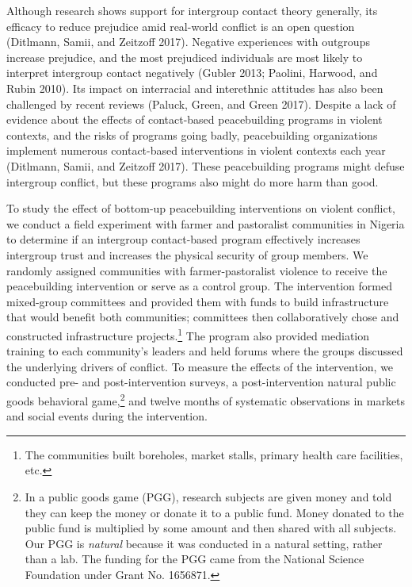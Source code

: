 \documentclass[11pt]{article}
\begin{document}
Although research shows support for intergroup contact theory generally,
its efficacy to reduce prejudice amid real-world conflict is an open
question (Ditlmann, Samii, and Zeitzoff 2017). Negative experiences with
outgroups increase prejudice, and the most prejudiced individuals are
most likely to interpret intergroup contact negatively (Gubler 2013;
Paolini, Harwood, and Rubin 2010). Its impact on interracial and
interethnic attitudes has also been challenged by recent reviews
(Paluck, Green, and Green 2017). Despite a lack of evidence about the
effects of contact-based peacebuilding programs in violent contexts, and
the risks of programs going badly, peacebuilding organizations implement
numerous contact-based interventions in violent contexts each year
(Ditlmann, Samii, and Zeitzoff 2017). These peacebuilding programs might
defuse intergroup conflict, but these programs also might do more harm
than good.

To study the effect of bottom-up peacebuilding interventions on violent
conflict, we conduct a field experiment with farmer and pastoralist
communities in Nigeria to determine if an intergroup contact-based
program effectively increases intergroup trust and increases the
physical security of group members. We randomly assigned communities
with farmer-pastoralist violence to receive the peacebuilding
intervention or serve as a control group. The intervention formed
mixed-group committees and provided them with funds to build
infrastructure that would benefit both communities; committees then
collaboratively chose and constructed infrastructure projects.\footnote{The
  communities built boreholes, market stalls, primary health care
  facilities, etc.} The program also provided mediation training to each
community's leaders and held forums where the groups discussed the
underlying drivers of conflict. To measure the effects of the
intervention, we conducted pre- and post-intervention surveys, a
post-intervention natural public goods behavioral game,\footnote{In a
  public goods game (PGG), research subjects are given money and told
  they can keep the money or donate it to a public fund. Money donated
  to the public fund is multiplied by some amount and then shared with
  all subjects. Our PGG is \emph{natural} because it was conducted in a
  natural setting, rather than a lab. The funding for the PGG came from
  the National Science Foundation under Grant No. 1656871.} and twelve
months of systematic observations in markets and social events during
the intervention.
\end{document}
